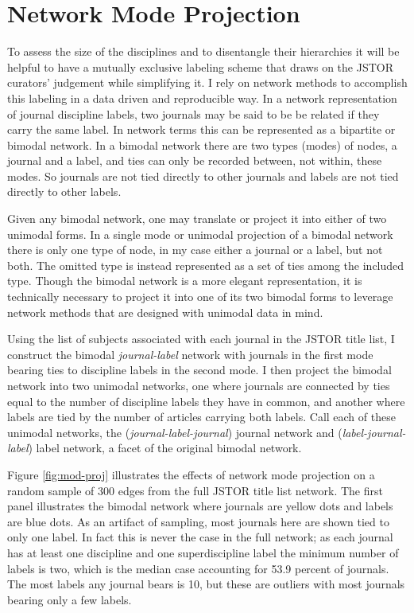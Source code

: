 \documentclass[]{book}
\theoremstyle{definition}
\theoremstyle{definition}
\theoremstyle{definition}
\theoremstyle{remark}
\begin{document}
\hypertarget{network-mode-projection}{%
\section{Network Mode Projection}\label{network-mode-projection}}

To assess the size of the disciplines and to disentangle their
hierarchies it will be helpful to have a mutually exclusive labeling
scheme that draws on the JSTOR curators' judgement while simplifying it.
I rely on network methods to accomplish this labeling in a data driven
and reproducible way. In a network representation of journal discipline
labels, two journals may be said to be be related if they carry the same
label. In network terms this can be represented as a bipartite or
bimodal network. In a bimodal network there are two types (modes) of
nodes, a journal and a label, and ties can only be recorded between, not
within, these modes. So journals are not tied directly to other journals
and labels are not tied directly to other labels.

Given any bimodal network, one may translate or project it into either
of two unimodal forms. In a single mode or unimodal projection of a
bimodal network there is only one type of node, in my case either a
journal or a label, but not both. The omitted type is instead
represented as a set of ties among the included type. Though the bimodal
network is a more elegant representation, it is technically necessary to
project it into one of its two bimodal forms to leverage network methods
that are designed with unimodal data in mind.

Using the list of subjects associated with each journal in the JSTOR
title list, I construct the bimodal \emph{journal-label} network with
journals in the first mode bearing ties to discipline labels in the
second mode. I then project the bimodal network into two unimodal
networks, one where journals are connected by ties equal to the number
of discipline labels they have in common, and another where labels are
tied by the number of articles carrying both labels. Call each of these
unimodal networks, the (\emph{journal-label-journal}) journal network
and (\emph{label-journal-label}) label network, a facet of the original
bimodal network.

Figure \ref{fig:mod-proj} illustrates the effects of network mode
projection on a random sample of 300 edges from the full JSTOR title
list network. The first panel illustrates the bimodal network where
journals are yellow dots and labels are blue dots. As an artifact of
sampling, most journals here are shown tied to only one label. In fact
this is never the case in the full network; as each journal has at least
one discipline and one superdiscipline label the minimum number of
labels is two, which is the median case accounting for 53.9 percent of
journals. The most labels any journal bears is 10, but these are
outliers with most journals bearing only a few labels.
\end{document}
